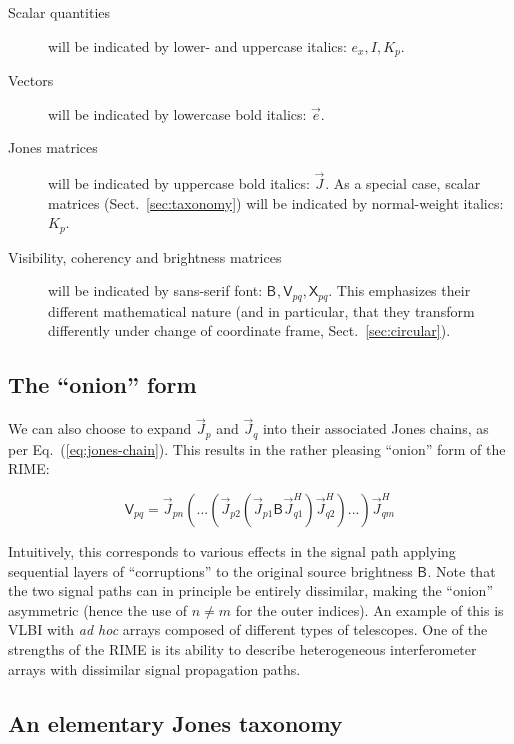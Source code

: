 \documentclass{aa}
\newcommand{\herm}{H}
\newcommand{\jones}[2]{\vec {#1}_{#2}}
\newcommand{\jonesT}[2]{\vec {#1}^{\herm}_{#2}}
\newcommand{\coh}[2]{\mathsf{{#1}}_{{#2}}}
\begin{document}
\begin{description}
\item[Scalar quantities] will be indicated by lower- and uppercase italics: $e_x,I,K_p$.
\item[Vectors] will be indicated by lowercase bold italics: $\vec e$.
\item[Jones matrices] will be indicated by uppercase bold italics: $\jones{J}{}$. As a special case, scalar matrices
(Sect.~\ref{sec:taxonomy}) will be indicated by normal-weight italics: $K_p$.
\item[Visibility, coherency and brightness matrices] will be indicated by sans-serif font: 
$\coh{B}{}, \coh{V}{pq}, \coh{X}{pq}$. This emphasizes their different mathematical nature (and in particular, that they transform differently under change of coordinate frame, Sect.~\ref{sec:circular}).
\end{description}

\subsection{The ``onion'' form}

We can also choose to expand $\jones{J}{p}$ and $\jones{J}{q}$ into their associated Jones chains, as per 
Eq.~(\ref{eq:jones-chain}). This results in the rather pleasing ``onion'' form of the RIME:

    \begin{equation}\label{eq:me0-onion}
    \coh{V}{pq} = \jones{J}{pn}(...(\jones{J}{p2} (\jones{J}{p1} \coh{B}{}  \jones{J}{q1}^\herm)\jonesT{J}{q2}) ... )\jonesT{J}{qm}
    \end{equation}

Intuitively, this corresponds to various effects in the signal path applying sequential layers of ``corruptions'' to the original source brightness $\coh{B}{}$. Note that the two signal paths can in principle be entirely dissimilar, making the ``onion'' asymmetric (hence the use of $n\ne m$ for the outer indices). An example of this is VLBI with \emph{ad hoc} arrays composed of different types of telescopes. One of the strengths of the RIME is its ability to describe heterogeneous interferometer arrays with dissimilar signal propagation paths.

\subsection{An elementary Jones taxonomy\label{sec:taxonomy}}
\end{document}
